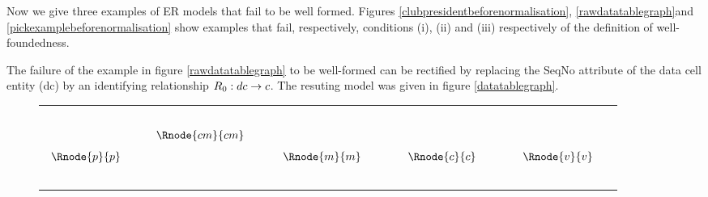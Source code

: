 \documentclass[10pt,a4paper]{article}
\begin{document}
Now we give three examples of ER models that fail to be well formed. 
Figures \ref{clubpresidentbeforenormalisation}, \ref{rawdatatablegraph}and  \ref{pickexamplebeforenormalisation}
show examples that fail, respectively, conditions (i), (ii) and (iii) respectively of the definition of well-foundedness. 

The failure of the example in figure \ref{rawdatatablegraph} to be well-formed can be rectified by 
replacing the SeqNo attribute of 
the data cell entity (dc) by an identifying relationship $R_0:dc \rightarrow c$. The resuting model was given in figure \ref{datatablegraph}.

\begin{figure} [h]
\begin{center}
\begin{tabular}{c c}
$
\begin{array}{cp{0.4cm}cp{0.5cm}cp{0.75cm}cp{0.75cm}c}
              &&                &&               &&                &&               \\[0.25cm]
              && \Rnode{cm}{cm} &&               &&                &&               \\[0.25cm]
\Rnode{p}{p}	&&                && \Rnode{m}{m}  &&   \Rnode{c}{c} && \Rnode{v}{v}  \\[0.25cm]
	            &&  
\end{array}
$


\end{tabular}
\end{center}
\end{figure}
\end{document}
